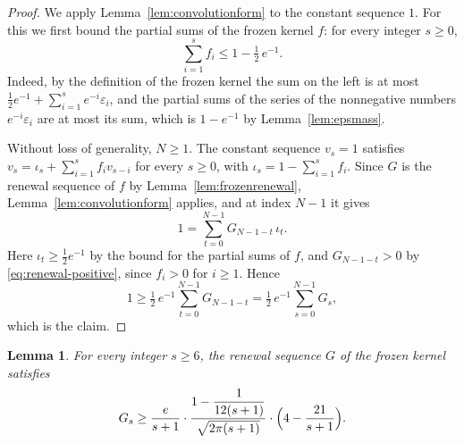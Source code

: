 \documentclass{amsart}
\newtheorem{lemma}[theorem]{Lemma}
\theoremstyle{definition}
\theoremstyle{remark}
\numberwithin{equation}{section}
\begin{document}
\begin{proof}
We apply Lemma~\ref{lem:convolutionform} to the constant sequence $1$. For this we first bound the partial sums of the frozen kernel $f$: for every integer $s\ge 0$,
\[
\sum_{i=1}^{s}f_i\le 1-\tfrac12\,e^{-1} .
\]
Indeed, by the definition of the frozen kernel the sum on the left is at most $\frac12e^{-1}+\sum_{i=1}^{s}e^{-i}\varepsilon_i$, and the partial sums of the series of the nonnegative numbers $e^{-i}\varepsilon_i$ are at most its sum, which is $1-e^{-1}$ by Lemma~\ref{lem:epsmass}.

Without loss of generality, $N\ge 1$. The constant sequence $v_s=1$ satisfies $v_s=\iota_s+\sum_{i=1}^{s}f_iv_{s-i}$ for every $s\ge 0$, with $\iota_s=1-\sum_{i=1}^{s}f_i$. Since $G$ is the renewal sequence of $f$ by Lemma~\ref{lem:frozenrenewal}, Lemma~\ref{lem:convolutionform} applies, and at index $N-1$ it gives
\[
1=\sum_{t=0}^{N-1}G_{N-1-t}\,\iota_t .
\]
Here $\iota_t\ge\frac12e^{-1}$ by the bound for the partial sums of $f$, and $G_{N-1-t}>0$ by \eqref{eq:renewal-positive}, since $f_i>0$ for $i\ge 1$. Hence
\[
1\ge\tfrac12\,e^{-1}\sum_{t=0}^{N-1}G_{N-1-t}=\tfrac12\,e^{-1}\sum_{s=0}^{N-1}G_s ,
\]
which is the claim.
\end{proof}

\begin{lemma}\label{lem:frozenlower}
For every integer $s\ge 6$, the renewal sequence $G$ of the frozen kernel satisfies
\[
G_s\ge\frac{e}{s+1}\cdot\frac{1-\dfrac{1}{12(s+1)}}{\sqrt{2\pi(s+1)}}\cdot\Bigl(4-\frac{21}{s+1}\Bigr).
\]
\end{lemma}
\end{document}
